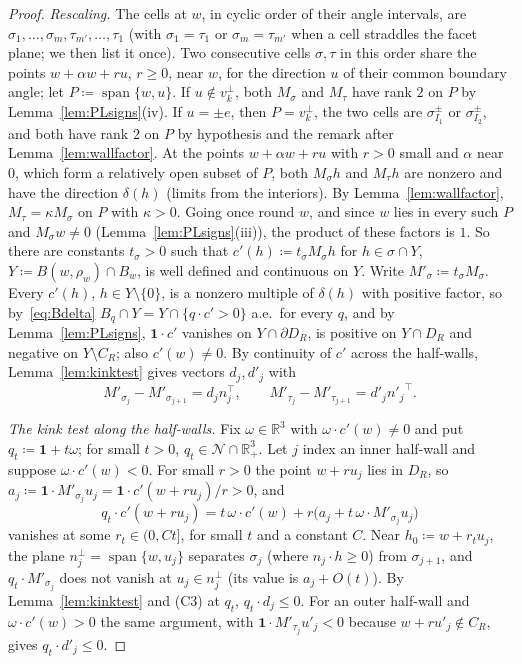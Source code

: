 \documentclass[11pt]{article}
\newcommand{\R}{\mathbb{R}}
\newcommand{\one}{\mathbf{1}}
\DeclareMathOperator{\spn}{span}
\theoremstyle{plain}
\theoremstyle{definition}
\theoremstyle{remark}
\begin{document}
\begin{proof}
\emph{Rescaling.} The cells at $w$, in cyclic order of their angle intervals, are
$\sigma_1,\dots,\sigma_m,\tau_{m'},\dots,\tau_1$ (with $\sigma_1=\tau_1$ or
$\sigma_m=\tau_{m'}$ when a cell straddles the facet plane; we then list it once). Two
consecutive cells $\sigma,\tau$ in this order share the points $w+\alpha w+ru$, $r\ge0$,
near $w$, for the direction $u$ of their common boundary angle; let $P\coloneqq\spn\{w,u\}$.
If $u\notin v_k^\perp$, both $M_\sigma$ and $M_\tau$ have rank $2$ on $P$ by
Lemma~\ref{lem:PLsigns}(iv). If $u=\pm e$, then $P=v_k^\perp$, the two cells are
$\sigma^\pm_{I_1}$ or $\sigma^\pm_{I_2}$, and both have rank $2$ on $P$ by hypothesis and
the remark after Lemma~\ref{lem:wallfactor}. At the points $w+\alpha w+ru$ with $r>0$ small
and $\alpha$ near $0$, which form a relatively open subset of $P$, both $M_\sigma h$ and
$M_\tau h$ are nonzero and have the direction $\delta(h)$ (limits from the interiors). By
Lemma~\ref{lem:wallfactor}, $M_\tau=\kappa M_\sigma$ on $P$ with $\kappa>0$. Going once
round $w$, and since $w$ lies in every such $P$ and $M_\sigma w\ne0$
(Lemma~\ref{lem:PLsigns}(iii)), the product of these factors is $1$. So there are
constants $t_\sigma>0$ such that $c'(h)\coloneqq t_\sigma M_\sigma h$ for $h\in\sigma\cap
Y$, $Y\coloneqq B(w,\rho_w)\cap B_w$, is well defined and continuous on $Y$. Write
$M'_\sigma\coloneqq t_\sigma M_\sigma$. Every $c'(h)$, $h\in Y\setminus\{0\}$, is a nonzero
multiple of $\delta(h)$ with positive factor, so by~\eqref{eq:Bdelta} $B_q\cap Y=Y\cap
\{q\cdot c'>0\}$ a.e.\ for every $q$, and by Lemma~\ref{lem:PLsigns}, $\one\cdot c'$
vanishes on $Y\cap\partial D_R$, is positive on $Y\cap D_R$ and negative on $Y\setminus
C_R$; also $c'(w)\ne0$. By continuity of $c'$ across the half-walls,
Lemma~\ref{lem:kinktest} gives vectors $d_j,d'_j$ with
\[
  M'_{\sigma_j}-M'_{\sigma_{j+1}}=d_jn_j^\top,\qquad M'_{\tau_j}-M'_{\tau_{j+1}}=
  d'_j{n'_j}^\top .
\]

\emph{The kink test along the half-walls.} Fix $\omega\in\R^3$ with $\omega\cdot c'(w)\ne0$
and put $q_t\coloneqq\one+t\omega$; for small $t>0$, $q_t\in\mathcal N\cap\R^3_+$. Let
$j$ index an inner half-wall and suppose $\omega\cdot c'(w)<0$. For small $r>0$ the point
$w+ru_j$ lies in $D_R$, so $a_j\coloneqq\one\cdot M'_{\sigma_j}u_j=\one\cdot c'(w+ru_j)/r>0$,
and
\[
  q_t\cdot c'(w+ru_j)=t\,\omega\cdot c'(w)+r\bigl(a_j+t\,\omega\cdot M'_{\sigma_j}u_j\bigr)
\]
vanishes at some $r_t\in(0,Ct]$, for small $t$ and a constant $C$. Near $h_0\coloneqq
w+r_tu_j$, the plane $n_j^\perp=\spn\{w,u_j\}$ separates $\sigma_j$ (where $n_j\cdot h\ge0$)
from $\sigma_{j+1}$, and $q_t\cdot M'_{\sigma_j}$ does not vanish at $u_j\in n_j^\perp$
(its value is $a_j+O(t)$). By Lemma~\ref{lem:kinktest} and (C3) at $q_t$, $q_t\cdot
d_j\le0$. For an outer half-wall and $\omega\cdot c'(w)>0$ the same argument, with
$\one\cdot M'_{\tau_j}u'_j<0$ because $w+ru'_j\notin C_R$, gives $q_t\cdot d'_j\le0$.


\end{proof}
\end{document}
